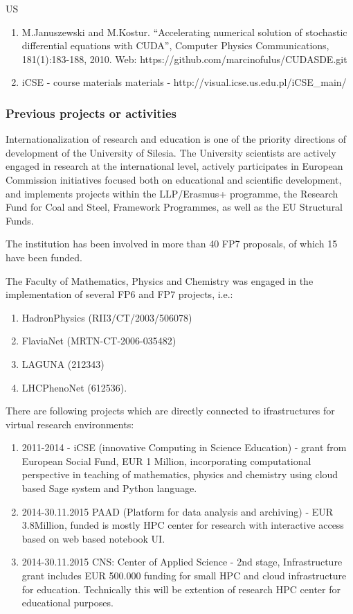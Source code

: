 \begin{sitedescription}{US}
\begin{enumerate}
\item  M.Januszewski and M.Kostur. ``Accelerating numerical solution of stochastic differential equations
with CUDA'',  Computer Physics Communications, 181(1):183-188, 2010. Web: https://github.com/marcinofulus/CUDASDE.git

\item iCSE - course materials  materials - http://visual.icse.us.edu.pl/iCSE\_main/

\end{enumerate}

\subsubsection*{Previous projects or activities}

Internationalization of research and education is one of the priority
directions of development of the University of Silesia. The University
scientists are actively engaged in research at the international
level, actively participates in European Commission initiatives
focused both on educational and scientific development, and implements
projects within the LLP/Erasmus+ programme, the Research Fund for Coal
and Steel, Framework Programmes, as well as the EU Structural Funds.

The institution has been involved in more than 40 FP7 proposals, of
which 15 have been funded.

The Faculty of Mathematics, Physics and Chemistry was engaged in the
implementation of several FP6 and FP7 projects, i.e.:

\begin{enumerate}
\item HadronPhysics (RII3/CT/2003/506078)
\item FlaviaNet (MRTN-CT-2006-035482)
\item LAGUNA (212343)
\item LHCPhenoNet (612536). 
\end{enumerate}

There are following projects which are directly connected to
ifrastructures for virtual research environments:

\begin{enumerate}
\item 2011-2014 - iCSE (innovative Computing in Science Education) -
  grant from European Social Fund, EUR 1 Million, incorporating
  computational perspective in teaching of mathematics, physics and
  chemistry using cloud based Sage system and Python language.
\item 2014-30.11.2015 PAAD (Platform for data analysis and archiving) - EUR
  3.8Million, funded is mostly HPC center for research with
  interactive access based on web based notebook UI.
\item 2014-30.11.2015 CNS: Center of Applied Science - 2nd stage,
  Infrastructure grant includes EUR 500.000 funding for small HPC and
  cloud infrastructure for education. Technically this will be
  extention of research HPC center for educational purposes.
\end{enumerate}




\end{sitedescription}
